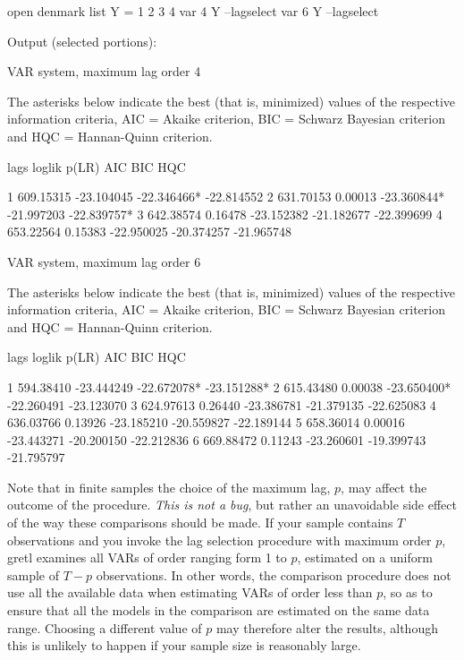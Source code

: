 \begin{script}[htbp]
  \caption{VAR lag selection via Information Criteria}
  \label{script:var-lagselect}
\begin{scode}
open denmark
list Y = 1 2 3 4
var 4 Y --lagselect
var 6 Y --lagselect
\end{scode}
Output (selected portions):
\begin{outbit}
VAR system, maximum lag order 4

The asterisks below indicate the best (that is, minimized) values
of the respective information criteria, AIC = Akaike criterion,
BIC = Schwarz Bayesian criterion and HQC = Hannan-Quinn criterion.

lags        loglik    p(LR)       AIC          BIC          HQC

   1     609.15315           -23.104045   -22.346466*  -22.814552 
   2     631.70153  0.00013  -23.360844*  -21.997203   -22.839757*
   3     642.38574  0.16478  -23.152382   -21.182677   -22.399699 
   4     653.22564  0.15383  -22.950025   -20.374257   -21.965748 

VAR system, maximum lag order 6

The asterisks below indicate the best (that is, minimized) values
of the respective information criteria, AIC = Akaike criterion,
BIC = Schwarz Bayesian criterion and HQC = Hannan-Quinn criterion.

lags        loglik    p(LR)       AIC          BIC          HQC

   1     594.38410           -23.444249   -22.672078*  -23.151288*
   2     615.43480  0.00038  -23.650400*  -22.260491   -23.123070 
   3     624.97613  0.26440  -23.386781   -21.379135   -22.625083 
   4     636.03766  0.13926  -23.185210   -20.559827   -22.189144 
   5     658.36014  0.00016  -23.443271   -20.200150   -22.212836 
   6     669.88472  0.11243  -23.260601   -19.399743   -21.795797 
\end{outbit}
\end{script}

Note that in finite samples the choice of the maximum lag, $p$, may
affect the outcome of the procedure. \textit{This is not a bug}, but
rather an unavoidable side effect of the way these comparisons should be
made. If your sample contains $T$ observations and you invoke the lag
selection procedure with maximum order $p$, gretl examines all VARs of
order ranging form 1 to $p$, estimated on a uniform sample of $T-p$
observations. In other words, the comparison procedure does not use all
the available data when estimating VARs of order less than $p$, so as to
ensure that all the models in the comparison are estimated on the same
data range. Choosing a different value of $p$ may therefore alter the
results, although this is unlikely to happen if your sample size is
reasonably large.

